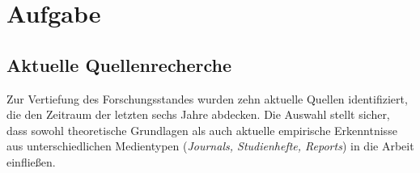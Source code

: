 
\chapter{Aufgabe}
\label{chap:5 Aufgabe}
\thispagestyle{fancy}
\section{Aktuelle Quellenrecherche} 
Zur Vertiefung des Forschungsstandes wurden zehn aktuelle Quellen identifiziert, die den Zeitraum der letzten sechs Jahre abdecken. Die Auswahl stellt sicher, dass sowohl theoretische Grundlagen als auch aktuelle empirische Erkenntnisse aus unterschiedlichen Medientypen (\textit{Journals, Studienhefte, Reports}) in die Arbeit einfließen.
